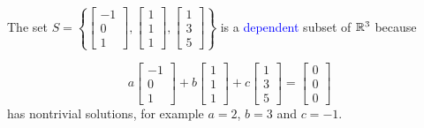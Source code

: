 \documentclass[pdf,9pt]{beamer}
\begin{document}
\begin{frame}[fragile]
    \begin{example}
	The set
	$S=\left\{
	    \left[\begin{array}{c} -1 \\ 0 \\ 1 \end{array}\right],
	    \left[\begin{array}{c} 1  \\ 1 \\ 1 \end{array}\right],
	    \left[\begin{array}{c} 1  \\ 3 \\ 5 \end{array}\right] \right\}$
	is a \textcolor{blue}{dependent} subset of $\mathbb{R}^3$ because

	\[
	    a\left[\begin{array}{c}  -1 \\ 0 \\ 1 \end{array}\right]
	    +b\left[\begin{array}{c} 1  \\ 1 \\ 1 \end{array}\right]
	    +c\left[\begin{array}{c} 1  \\ 3 \\ 5 \end{array}\right]
	    =\left[\begin{array}{c}  0  \\ 0 \\ 0 \end{array}\right]
	\]
	has nontrivial solutions,
	for example $a=2$, $b=3$ and $c=-1$.
    \end{example}
\end{frame}
\end{document}
